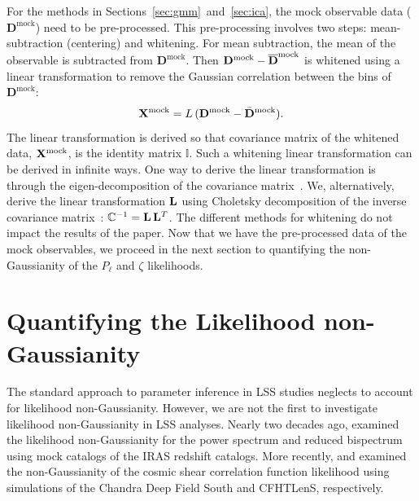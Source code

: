 \documentclass[12pt, letterpaper, preprint]{aastex}
\newcommand{\beq}{\begin{equation}}
\newcommand{\eeq}{\end{equation}}
\newcommand{\Dmock}{\mathbf{D}^\mathrm{mock}}
\newcommand{\Xmock}{{\bf X}^\mathrm{mock}}
\begin{document}
For the methods in Sections~\ref{sec:gmm}~and~\ref{sec:ica}, the mock 
observable data ($\Dmock$) need to be pre-processed. This pre-processing
involves two steps: mean-subtraction (centering) and whitening. For mean subtraction, 
the mean of the observable is subtracted from $\Dmock$. Then 
$\Dmock - \overline{\bf D}^\mathrm{mock}$ is whitened using a linear transformation 
to remove the Gaussian correlation between the bins of $\Dmock$: 
\beq
\Xmock = L\,(\Dmock - \bar{\bf D}^\mathrm{mock}). 
\eeq
The linear transformation is derived so that covariance matrix of the whitened 
data, $\Xmock$, is the identity matrix $\mathbb{I}$. Such a whitening linear 
transformation can be derived in infinite ways. 
One way to derive the linear transformation is through the eigen-decomposition
of the covariance matrix~\citep[\emph{e.g.}][]{hartlap2009, sellentin2017}. We, alternatively, 
derive the linear transformation ${\bf L}$ using Choletsky decomposition of the 
inverse covariance matrix~\citep{Press:1992:NRC:148286}: 
$\mathbb{C}^{-1} = {\bf L}\,{\bf L}^T$. The different methods for whitening 
do not impact the results of the paper. Now that we have the pre-processed 
data of the mock observables, we proceed in the next section to quantifying 
the non-Gaussianity of the $P_\ell$ and $\zeta$ likelihoods. 


\section{Quantifying the Likelihood non-Gaussianity} \label{sec:div}
The standard approach to parameter inference in LSS studies neglects
to account for likelihood non-Gaussianity. 
However, we are not the first to investigate likelihood non-Gaussianity 
in LSS analyses. Nearly two decades ago, \cite{scoccimarro2000} examined 
the likelihood non-Gaussianity for the power spectrum and reduced bispectrum 
using mock catalogs of the IRAS redshift catalogs. More recently, 
\cite{hartlap2009} and \cite{sellentin2017} examined the non-Gaussianity 
of the cosmic shear correlation function likelihood using simulations of 
the Chandra Deep Field South and CFHTLenS, respectively. 
\end{document}
